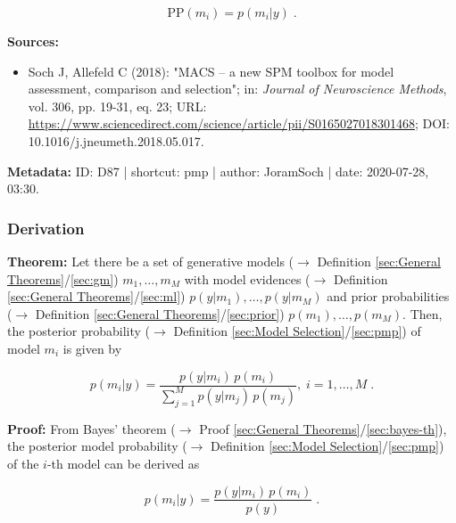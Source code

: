 \documentclass[a4paper,12pt,twoside]{book}
\begin{document}
\begin{equation} \label{eq:pmp-PMP}
\mathrm{PP}(m_i) = p(m_i|y) \; .
\end{equation}


\vspace{1em}
\textbf{Sources:}
\begin{itemize}
\item Soch J, Allefeld C (2018): "MACS – a new SPM toolbox for model assessment, comparison and selection"; in: \textit{Journal of Neuroscience Methods}, vol. 306, pp. 19-31, eq. 23; URL: \url{https://www.sciencedirect.com/science/article/pii/S0165027018301468}; DOI: 10.1016/j.jneumeth.2018.05.017.
\end{itemize}


\vspace{1em}
\textbf{Metadata:} ID: D87 | shortcut: pmp | author: JoramSoch | date: 2020-07-28, 03:30.
\vspace{1em}



\subsubsection[\textbf{Derivation}]{Derivation} \label{sec:pmp-der}
\setcounter{equation}{0}

\textbf{Theorem:} Let there be a set of generative models ($\rightarrow$ Definition \ref{sec:General Theorems}/\ref{sec:gm}) $m_1, \ldots, m_M$ with model evidences ($\rightarrow$ Definition \ref{sec:General Theorems}/\ref{sec:ml}) $p(y \vert m_1), \ldots, p(y \vert m_M)$ and prior probabilities ($\rightarrow$ Definition \ref{sec:General Theorems}/\ref{sec:prior})  $p(m_1), \ldots, p(m_M)$. Then, the posterior probability ($\rightarrow$ Definition \ref{sec:Model Selection}/\ref{sec:pmp}) of model $m_i$ is given by

\begin{equation} \label{eq:pmp-der-PMP}
p(m_i|y) = \frac{p(y|m_i) \, p(m_i)}{\sum_{j=1}^{M} p(y|m_j) \, p(m_j)}, \; i = 1, \ldots, M \; .
\end{equation}


\vspace{1em}
\textbf{Proof:} From Bayes' theorem ($\rightarrow$ Proof \ref{sec:General Theorems}/\ref{sec:bayes-th}), the posterior model probability ($\rightarrow$ Definition \ref{sec:Model Selection}/\ref{sec:pmp}) of the $i$-th model can be derived as

\begin{equation} \label{eq:pmp-der-PMP-s1}
p(m_i|y) = \frac{p(y|m_i) \, p(m_i)}{p(y)} \; .
\end{equation}
\end{document}
